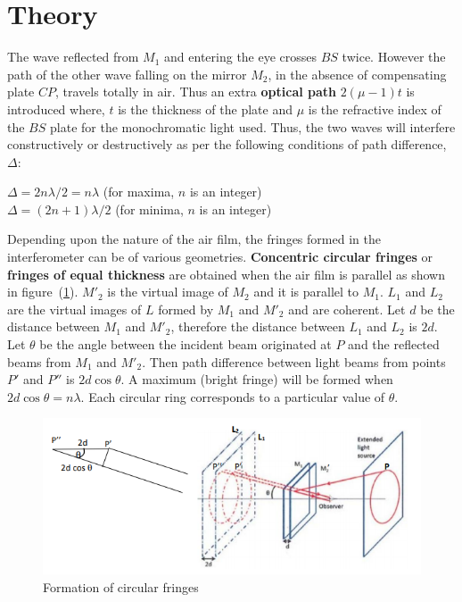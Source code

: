 \documentclass{article}
\begin{document}
\section{Theory}
\noindent The wave reflected from $M_1$ and entering the eye crosses $BS$ twice. 
However the path of the other wave falling on the mirror $M_2$, in the absence of compensating 
plate $CP$, travels totally in air. Thus an extra \textbf{optical path} $2(\mu - 1)t$ is introduced where, $t$ is 
the thickness of the plate and $\mu$ is the refractive index of the $BS$ plate for the 
monochromatic light used. Thus, the two waves will interfere constructively or destructively as per the following conditions of path difference, $\Delta$:
\begin{center}
    $\Delta = 2 n \lambda /2 = n \lambda$ \hspace{1cm} (for maxima, $n$ is an integer)\\
    $\Delta = (2n + 1) \lambda /2$ \hspace{1cm} (for minima, $n$ is an integer)
\end{center}
\par
\noindent
Depending upon the nature of the air film, the fringes formed in the interferometer can be of various geometries. \textbf{Concentric circular fringes} or \textbf{fringes of equal thickness} are obtained when the air film is parallel as shown in figure~(\ref{fig:circular_fringes}). $M'_2$ is the virtual image of $M_2$ and it is parallel to $M_1$. $L_1$ and $L_2$ are the virtual images of $L$ formed by $M_1$ and $M'_2$ and are coherent. Let $d$ be the distance between $M_1$ and $M'_2$, therefore the distance between $L_1$ and $L_2$ is $2d$. Let $\theta$ be the angle between the incident beam originated at $P$ and the reflected beams from $M_1$ and $M'_2$. Then path difference between light beams from points $P'$ and $P''$ is $2d \cos{\theta}$. A maximum (bright fringe) will be formed when $2d \cos{\theta} = n \lambda$. Each circular ring corresponds to a particular value of $\theta$.
\begin{figure}[h!]
    \centering
    \includegraphics[scale = 0.7]{Figures/form of circl fringes.png}
    \caption{Formation of circular fringes}
    \label{fig:circular_fringes}
\end{figure}
\end{document}
